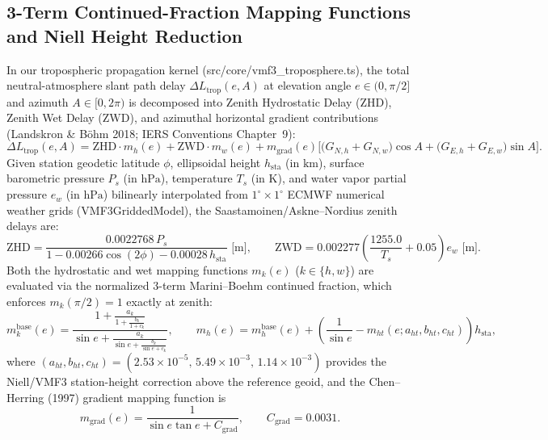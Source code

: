 \documentclass[11pt,a4paper,reqno]{article}
\def\texttt#1{#1}%
\def\path#1{#1}%
\theoremstyle{plain}
\theoremstyle{definition}
\theoremstyle{remark}
\numberwithin{equation}{section}
\begin{document}
\subsection{3-Term Continued-Fraction Mapping Functions and Niell Height Reduction}
In our tropospheric propagation kernel (\path{src/core/vmf3_troposphere.ts}), the total neutral-atmosphere slant path delay $\Delta L_{\text{trop}}(e, A)$ at elevation angle $e \in (0, \pi/2]$ and azimuth $A \in [0, 2\pi)$ is decomposed into Zenith Hydrostatic Delay ($\text{ZHD}$), Zenith Wet Delay ($\text{ZWD}$), and azimuthal horizontal gradient contributions (Landskron \& B\"{o}hm 2018; IERS Conventions Chapter~9):
\begin{equation}
  \Delta L_{\text{trop}}(e, A) = \text{ZHD} \cdot m_h(e) + \text{ZWD} \cdot m_w(e) + m_{\text{grad}}(e)\Big[ \big(G_{N,h} + G_{N,w}\big)\cos A + \big(G_{E,h} + G_{E,w}\big)\sin A \Big].
  \label{eq:vmf3_total}
\end{equation}
Given station geodetic latitude $\phi$, ellipsoidal height $h_{\text{sta}}$ (in $\text{km}$), surface barometric pressure $P_s$ (in $\text{hPa}$), temperature $T_s$ (in $\text{K}$), and water vapor partial pressure $e_w$ (in $\text{hPa}$) bilinearly interpolated from $1^\circ \times 1^\circ$ ECMWF numerical weather grids (\texttt{VMF3GriddedModel}), the Saastamoinen/Askne--Nordius zenith delays are:
\begin{equation}
  \text{ZHD} = \frac{0.0022768\,P_s}{1 - 0.00266\cos(2\phi) - 0.00028\,h_{\text{sta}}}\text{ [m]}, \qquad \text{ZWD} = 0.002277\left(\frac{1255.0}{T_s} + 0.05\right)e_w\text{ [m]}.
  \label{eq:zhd_zwd}
\end{equation}
Both the hydrostatic and wet mapping functions $m_k(e)$ ($k \in \{h, w\}$) are evaluated via the normalized 3-term Marini--Boehm continued fraction, which enforces $m_k(\pi/2) = 1$ exactly at zenith:
\begin{equation}
  m_k^{\text{base}}(e) = \frac{\displaystyle 1 + \frac{a_k}{\displaystyle 1 + \frac{b_k}{1 + c_k}}}{\displaystyle \sin e + \frac{a_k}{\displaystyle \sin e + \frac{b_k}{\sin e + c_k}}}, \qquad m_h(e) = m_h^{\text{base}}(e) + \left(\frac{1}{\sin e} - m_{ht}(e; a_{ht}, b_{ht}, c_{ht})\right)h_{\text{sta}},
  \label{eq:vmf3_cf}
\end{equation}
where $(a_{ht}, b_{ht}, c_{ht}) = (2.53 \times 10^{-5},\, 5.49 \times 10^{-3},\, 1.14 \times 10^{-3})$ provides the Niell/VMF3 station-height correction above the reference geoid, and the Chen--Herring (1997) gradient mapping function is
\begin{equation}
  m_{\text{grad}}(e) = \frac{1}{\sin e \tan e + C_{\text{grad}}}, \qquad C_{\text{grad}} = 0.0031.
  \label{eq:chen_herring}
\end{equation}
\end{document}

